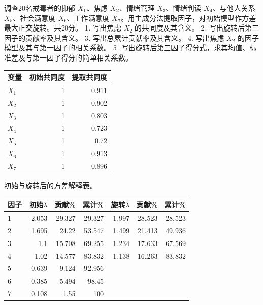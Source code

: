 

调查20名戒毒者的抑郁 \(X_1\)、焦虑 \(X_2\)、情绪管理 \(X_3\)、情绪判读 \(X_4\)、与他人关系 \(X_5\)、社会满意度 \(X_6\)、工作满意度 \(X_7\)。用主成分法提取因子，对初始模型作方差最大正交旋转。共20分。 1. 写出焦虑 \(X_2\) 的共同度及其含义。 2. 写出旋转后第三因子的贡献率及其含义。 3. 写出总累计贡献率及其含义。 4. 写出焦虑 \(X_2\) 的因子模型及其与第一因子的相关系数。 5. 写出旋转后第三因子得分式，求其均值、标准差及与第一因子得分的简单相关系数。

\begin{center}\small\setlength{\tabcolsep}{4pt}\renewcommand{\arraystretch}{1.18}\begin{tabular}{@{}lrr@{}}
\toprule
变量 & 初始共同度 & 提取共同度 \\
\midrule

\(X_1\) & 1 & 0.911 \\
\(X_2\) & 1 & 0.902 \\
\(X_3\) & 1 & 0.803 \\
\(X_4\) & 1 & 0.723 \\
\(X_5\) & 1 & 0.72 \\
\(X_6\) & 1 & 0.913 \\
\(X_7\) & 1 & 0.896 \\
\bottomrule\end{tabular}\end{center}

初始与旋转后的方差解释表。

\begin{center}\small\setlength{\tabcolsep}{4pt}\renewcommand{\arraystretch}{1.18}\begin{tabular}{@{}lrrrrrr@{}}
\toprule
因子 & 初始\(\lambda\) & 贡献\% & 累计\% & 旋转\(\lambda\) & 贡献\% & 累计\% \\
\midrule

1 & 2.053 & 29.327 & 29.327 & 1.997 & 28.523 & 28.523 \\
2 & 1.695 & 24.22 & 53.547 & 1.499 & 21.413 & 49.936 \\
3 & 1.1 & 15.708 & 69.255 & 1.234 & 17.633 & 67.569 \\
4 & 1.02 & 14.577 & 83.832 & 1.138 & 16.263 & 83.832 \\
5 & 0.639 & 9.124 & 92.956 & & & \\
6 & 0.385 & 5.494 & 98.45 & & & \\
7 & 0.108 & 1.55 & 100 & & & \\
\bottomrule\end{tabular}\end{center}

